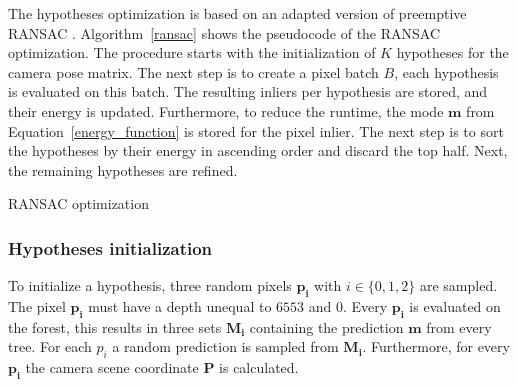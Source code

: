 \documentclass[final]{cvpr}
\begin{document}
The hypotheses optimization is based on an adapted version of preemptive RANSAC \cite{shotton2013}.
Algorithm~\ref{ransac} shows the pseudocode of the RANSAC optimization.
The procedure starts with the initialization of $K$ hypotheses for the camera pose matrix. 
The next step is to create a pixel batch $B$,
each hypothesis is evaluated on this batch. The resulting inliers per hypothesis  are stored, and their energy is 
updated. Furthermore, to reduce the runtime, the mode $\boldsymbol{m}$ from Equation~\ref{energy_function} is stored for
the pixel inlier.
The next step is to sort the hypotheses by their energy in ascending order and discard the top half. Next, the remaining hypotheses are refined.

\begin{algorithm}
	\caption{RANSAC optimization}
	\label{ransac}
\end{algorithm}

\subsubsection{Hypotheses initialization}
To initialize a hypothesis, three random pixels $$ with $i \in \{0,1,2\}$ are sampled. The pixel $$ must have a depth unequal to $6553$ and $0$. Every $$ is evaluated on the forest, this results in three sets 
$$ containing the prediction $$ from every tree. For each $p_{i}$ a random prediction is sampled from $$. Furthermore, for every $$ the camera scene coordinate $$ is calculated.
\end{document}
